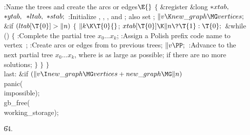 \Y\B\4:Name the trees and create the arcs or edges\X${}\E{}$\6
${}\{{}$\5
\1\&{register} \&{long} ${}{*}\\{xtab},{}$ ${}{*}\\{ytab},{}$ ${}{*}%
\\{ltab},{}$ ${}{*}\\{stab};{}$\7
:Initialize , , , and ;
also set \X;\6
${}\|v\K\\{new\_graph}\MG\\{vertices};{}$\6
\&{if} ${}(\\{ltab}[\T{0}]>\|n){}$\5
${}\{{}$\1\6
${}\|k\K\T{0}{}$;\5
${}\\{xtab}[\T{0}]\K\|n\?\T{1}:\T{0};{}$\6
\&{while} ()\5
${}\{{}$\1\6
:Complete the partial tree $x_0\ldots x_k$\X;\6
:Assign a Polish prefix code name to vertex~\X;\6
:Create arcs or edges from  to previous trees\X;\6
${}\|v\PP;{}$\6
:Advance to the next partial tree $x_0\ldots x_k$, where  is as
large as possible;  if there are no more solutions\X;\6
\4${}\}{}$\2\6
\4${}\}{}$\2\6
\4${}\}{}$\2\6
\4\\{last}:\5
\&{if} ${}(\|v\I\\{new\_graph}\MG\\{vertices}+\\{new\_graph}\MG\|n){}$\1\5
\\{panic}(\\{impossible});\2\6
\\{gb\_free}(\\{working\_storage});\par
\U64.\fi

